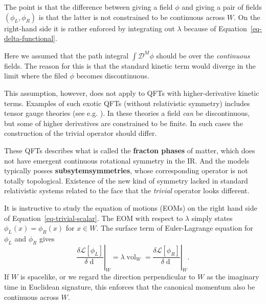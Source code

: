 \documentclass[
  letterpaper,
  DIV=11,
  numbers=noendperiod]{scrreport}
\DeclareMathOperator{\vol}{vol}
\begin{document}
The point is that the difference between giving a field \(\phi\) and
giving a pair of fields \((\phi_L,\phi_R)\) is that the latter is not
constrained to be continuous across \(W\). On the right-hand side it is
rather enforced by integrating out \(\lambda\) because of
Equation~\ref{eq-delta-functional}.

\begin{tcolorbox}[enhanced jigsaw, colframe=quarto-callout-tip-color-frame, leftrule=.75mm, bottomrule=.15mm, breakable, toptitle=1mm, toprule=.15mm, coltitle=black, opacityback=0, opacitybacktitle=0.6, titlerule=0mm, colbacktitle=quarto-callout-tip-color!10!white, colback=white, bottomtitle=1mm, title=\textcolor{quarto-callout-tip-color}{\faLightbulb}\hspace{0.5em}{\textsf{Continuity of fields in ``exotic'' QFTs and subsystem symmetry}}, rightrule=.15mm, arc=.35mm, left=2mm]

Here we assumed that the path integral \(\int\mathcal{D}^M\phi\) should
be over the \emph{continuous} fields. The reason for this is that the
standard kinetic term would diverge in the limit where the filed
\(\phi\) becomes discontinuous.

This assumption, however, does not apply to QFTs with higher-derivative
kinetic terms. Examples of such exotic QFTs (without relativistic
symmetry) includes tensor gauge theories (see e.g.
\autocite{Pretko:2020cko,Seiberg:2020bhn}). In these theories a field
\emph{can} be discontinuous, but some of higher derivatives are
constrained to be finite. In such cases the construction of the trivial
operator should differ.

These QFTs describes what is called the \textbf{fracton phases} of
matter, which does not have emergent continuous rotational symmetry in
the IR. And the models typically posses \textbf{subsytemsymmetries},
whose corresponding operator is not totally topological. Existence of
the new kind of symmetry lacked in standard relativistic systems related
to the face that the \emph{trivial} operator looks different.

\end{tcolorbox}

It is instructive to study the equation of motions (EOMs) on the right
hand side of Equation~\ref{eq-trivial-scalar}. The EOM with respect to
\(\lambda\) simply states \(\phi_L(x) = \phi_R(x)\) for \(x\in W\). The
surface term of Euler-Lagrange equation for \(\phi_L\) and \(\phi_R\)
gives \[
    \left.\frac{\delta \mathcal{L}[\phi_L]}{\delta \mathop{d\phi_L}}\right|_W = \lambda \vol_W = \left. \frac{\delta \mathcal{L}[\phi_R]}{\delta \mathop{d \phi_R}}\right|_W.
\] If \(W\) is spacelike, or we regard the direction perpendicular to
\(W\) as the imaginary time in Euclidean signature, this enforces that
the canonical momentum also be continuous across \(W\).
\end{document}
